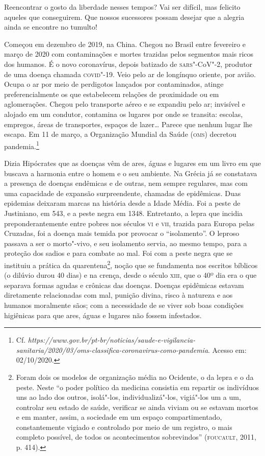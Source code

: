 Reencontrar o gosto da liberdade nesses tempos? Vai ser difícil, mas
felicito aqueles que conseguirem. Que nossos sucessores possam desejar
que a alegria ainda se encontre no tumulto!



Começou em dezembro de 2019, na China. Chegou no Brasil entre fevereiro
e março de 2020 com contaminações e mortes trazidas pelos segmentos mais
ricos dos humanos. É o novo coronavírus, depois batizado de \textsc{sars}"-CoV"-2,
produtor de uma doença chamada \textsc{covid}"-19. Veio pelo ar de longínquo
oriente, por avião. Ocupa o ar por meio de perdigotos lançados por
contaminados, atinge preferencialmente os que estabelecem relações de
proximidade ou em aglomerações. Chegou pelo transporte aéreo e se
expandiu pelo ar; invisível e alojado em um condutor, contamina os
lugares por onde se transita: escolas, empregos, áreas de transportes,
espaços de lazer\ldots{} Parece que nenhum lugar lhe escapa. Em 11 de março,
a Organização Mundial da Saúde (\textsc{oms}) decretou pandemia.\footnote{Cf.
  \emph{https://www.gov.br/pt-br/noticias/saude-e-vigilancia-sanitaria/2020/03/oms-classifica-coronavirus-como-pandemia}.
  Acesso em: 02/10/2020.}

Dizia Hipócrates que as doenças vêm de ares, águas e lugares em um livro
em que buscava a harmonia entre o homem e o seu ambiente. Na Grécia já
se constatava a presença de doenças endêmicas e de outras, nem sempre
regulares, mas com uma capacidade de expansão surpreendente, chamadas de
epidêmicas. Duas epidemias deixaram marcas na história desde a Idade
Média. Foi a peste de Justiniano, em 543, e a peste negra em 1348.
Entretanto, a lepra que incidia preponderantemente entre pobres nos
séculos \textsc{vi} e \textsc{vii}, trazida para Europa pelas Cruzadas, foi a doença mais
temida por provocar o ``isolamento''. O leproso passava a ser o
morto"-vivo, e seu isolamento servia, ao mesmo tempo, para a proteção dos
sadios e para combate ao mal. Foi com a peste negra que se instituiu a
prática da quarentena\footnote{Foram dois os modelos de organização
  média no Ocidente, o da lepra e o da peste. Neste ``o poder político
  da medicina consistia em repartir os indivíduos uns ao lado dos
  outros, isolá"-los, individualizá"-los, vigiá"-los um a um, controlar seu
  estado de saúde, verificar se ainda viviam ou se estavam mortos e em
  manter, assim, a sociedade em um espaço compartimentado,
  constantemente vigiado e controlado por meio de um registro, o mais
  completo possível, de todos os acontecimentos sobrevindos'' (\textsc{foucault},
  2011, p. 414).}, noção que se fundamenta nos escritos bíblicos (o
dilúvio durou 40 dias) e na crença, desde o século \textsc{xiii}, que o 40º dia
era o que separava formas agudas e crônicas das doenças. Doenças
epidêmicas estavam diretamente relacionadas com mal, punição divina,
risco à natureza e aos humanos moralmente sãos; com a necessidade de se
viver sob boas condições higiênicas para que ares, águas e lugares não
fossem infestados.


